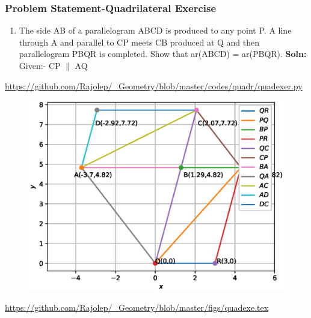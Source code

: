 \begin{frame}
\frametitle{Problem Statement-Quadrilateral Exercise}
\begin{enumerate}[label=(\roman*)]
\item The side AB of a parallelogram ABCD is produced to any point P. A line through A and
parallel to CP meets CB produced at Q and then parallelogram PBQR is completed. Show
that ar(ABCD) = ar(PBQR).
\textbf{Soln:}\\
Given:- CP $\parallel$ AQ
  \end{enumerate} 
\url{https://github.com/Rajolep/_Geometry/blob/master/codes/quadr/quadexer.py}
\begin{figure}
\includegraphics[scale=0.3]{./figs/quadexer.eps}
\end{figure}
\end{frame}
\begin{frame}
\begin{figure}

\end{figure}
\url{https://github.com/Rajolep/_Geometry/blob/master/figs/quadexe.tex}
\end{frame}
